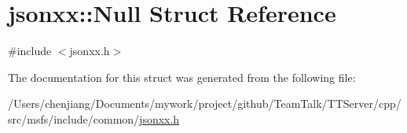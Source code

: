 \hypertarget{structjsonxx_1_1_null}{}\section{jsonxx\+:\+:Null Struct Reference}
\label{structjsonxx_1_1_null}


{\ttfamily \#include $<$jsonxx.\+h$>$}



The documentation for this struct was generated from the following file\+:\begin{DoxyCompactItemize}
\item 
/\+Users/chenjiang/\+Documents/mywork/project/github/\+Team\+Talk/\+T\+T\+Server/cpp/src/msfs/include/common/\hyperlink{msfs_2include_2common_2jsonxx_8h}{jsonxx.\+h}\end{DoxyCompactItemize}
